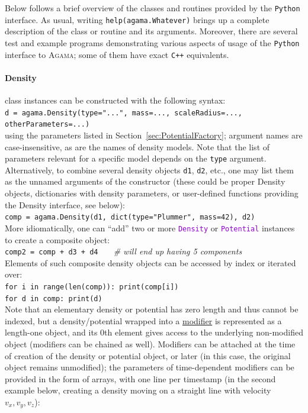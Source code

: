 \documentclass[12pt]{article}
\newcommand{\Agama}{\textsc{Agama}\xspace}
\newcommand{\Cpp}  {\texttt{C++}\xspace}
\newcommand{\Python}{\texttt{Python}\xspace}
\newcommand{\ttt}[1]{\textcolor{darkviolet}{\texttt{#1}}}
\let\oldparagraph\paragraph
\renewcommand{\paragraph}[1]{\vspace{-2mm}\oldparagraph{#1}}
\begin{document}
Below follows a brief overview of the classes and routines provided by the \Python interface.
As usual, writing \texttt{help(agama.Whatever)} brings up a complete description of the class or routine and its arguments. Moreover, there are several test and example programs demonstrating various aspects of usage of the \Python interface to \Agama; some of them have exact \Cpp equivalents.

\paragraph{Density} class instances can be constructed with the following syntax: \\
\texttt{d = agama.Density(type="...", mass=..., scaleRadius=..., otherParameters=...)}\\
using the parameters listed in Section~\ref{sec:PotentialFactory}; argument names are case-insensitive, as are the names of density models. Note that the list of parameters relevant for a specific model depends on the \texttt{type} argument.
Alternatively, to combine several density objects \texttt{d1}, \texttt{d2}, etc., one may list them as the unnamed arguments of the constructor (these could be proper Density objects, dictionaries with density parameters, or user-defined functions providing the Density interface, see below):\\
\texttt{comp = agama.Density(d1, dict(type="Plummer", mass=42), d2)}\\[2mm]
More idiomatically, one can ``add'' two or more \ttt{Density} or \ttt{Potential} instances to create a composite object:\\
\texttt{comp2 = comp + d3 + d4}\textit{\color{Sepia} \ \ \ \# will end up having 5 components}\\[2mm]
Elements of such composite density objects can be accessed by index or iterated over:\\
\texttt{for i in range(len(comp)): print(comp[i])}\\
\texttt{for d in comp: print(d)}\\[2mm]
Note that an elementary density or potential has zero length and thus cannot be indexed, but a density/potential wrapped into a \hyperref[sec:PotentialModifiers]{modifier} is represented as a length-one object, and its 0th element gives access to the underlying non-modified object (modifiers can be chained as well). Modifiers can be attached at the time of creation of the density or potential object, or later (in this case, the original object remains unmodified); the parameters of time-dependent modifiers can be provided in the form of arrays, with one line per timestamp (in the second example below, creating a density moving on a straight line with velocity $v_x,v_y,v_z$):\\
\end{document}
